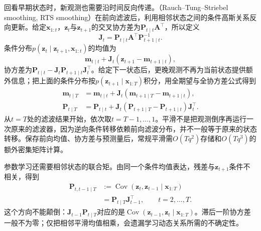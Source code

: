 回看早期状态时，新观测也需要沿时间反向传递。（Rauch--Tung--Striebel smoothing, RTS smoothing）在前向滤波后，利用相邻状态之间的条件高斯关系反向更新。给定$\bm{x}_{1:t}$，$\bm{z}_t$与$\bm{z}_{t+1}$的交叉协方差为$\bm{P}_{t\mid t}\bm{A}^{\top}$，所以定义
\[
  \bm{J}_t=\bm{P}_{t\mid t}\bm{A}^{\top}
    \bm{P}_{t+1\mid t}^{-1}.
\]
条件分布$p(\bm{z}_t\mid\bm{z}_{t+1},\bm{x}_{1:t})$的均值为
\[
  \bm{m}_{t\mid t}
    +\bm{J}_t(\bm{z}_{t+1}-\bm{m}_{t+1\mid t}),
\]
协方差为$\bm{P}_{t\mid t}-\bm{J}_t\bm{P}_{t+1\mid t}\bm{J}_t^\top$。给定下一状态后，更晚观测不再为当前状态提供额外信息；把上面的条件分布按$p(\bm{z}_{t+1}\mid\bm{x}_{1:T})$积分，用全期望与全协方差公式得到
\begin{equation}
  \begin{aligned}
    \bm{m}_{t\mid T}
      &=\bm{m}_{t\mid t}
        +\bm{J}_t(\bm{m}_{t+1\mid T}
          -\bm{m}_{t+1\mid t}),\\
    \bm{P}_{t\mid T}
      &=\bm{P}_{t\mid t}
        +\bm{J}_t(\bm{P}_{t+1\mid T}
          -\bm{P}_{t+1\mid t})\bm{J}_t^\top.
  \end{aligned}
  \label{eq:pgm-dynamic-rts}
\end{equation}
从$t=T$处的滤波结果开始，依次取$t=T-1,\ldots,1$。平滑不是把观测倒序再运行一次原来的滤波器，因为逆向条件转移依赖前向滤波分布，并不一般等于原来的状态转移。保存前向均值、协方差与预测量后，常规平滑需$O(Tq^2)$存储和$O(Tq^3)$的额外密集矩阵计算。

参数学习还需要相邻状态的联合矩。由同一个条件均值表达，残差与$\bm{z}_{t+1}$条件不相关，得到
\begin{equation}
  \begin{aligned}
    \bm{P}_{t,t-1\mid T}
      &:=\operatorname{Cov}(\bm{z}_t,\bm{z}_{t-1}
        \mid\bm{x}_{1:T})\\
      &=\bm{P}_{t\mid T}\bm{J}_{t-1}^{\top},
      \qquad t=2,\ldots,T.
  \end{aligned}
  \label{eq:pgm-dynamic-lag-covariance}
\end{equation}
这个方向不能颠倒：$\bm{J}_{t-1}\bm{P}_{t\mid T}$对应的是$\operatorname{Cov}(\bm{z}_{t-1},\bm{z}_{t}\mid\bm{x}_{1:T})$。滞后一阶协方差一般不为零；仅把相邻平滑均值相乘，会遗漏学习动态关系所需的不确定性。

